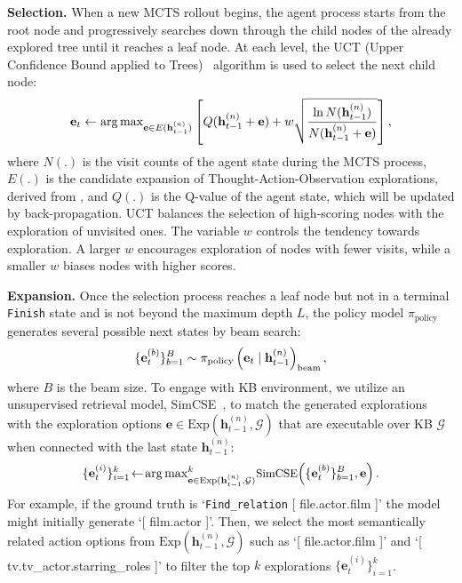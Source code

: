\documentclass{article}
\theoremstyle{plain}
\theoremstyle{definition}
\theoremstyle{remark}
\begin{document}
\textbf{Selection. } When a new MCTS rollout begins, the agent process starts from the root node and progressively searches down through the child nodes of the already explored tree until it reaches a leaf node. At each level, the UCT (Upper Confidence Bound applied to Trees)~\citep{MCTS} algorithm is used to select the next child node:
\begin{equation}
\small
    \mathbf{e}_t \gets {\arg\max}_{\mathbf{e} \in E(\mathbf{h}^{(n)}_{t-1})} \left[ Q(\mathbf{h}^{(n)}_{t-1}+\mathbf{e}) + w \sqrt{\frac{\ln N(\mathbf{h}^{(n)}_{t-1})}{N(\mathbf{h}^{(n)}_{t-1}+\mathbf{e})}} \right],
\end{equation}
where $N(.)$ is the visit counts of the agent state during the MCTS process, $E(.)$ is the candidate expansion of Thought-Action-Observation explorations, derived from , and $Q(.)$ is the Q-value of the agent state, which will be updated by back-propagation. UCT balances the selection of high-scoring nodes with the exploration of unvisited ones. The variable $w$ controls the tendency towards exploration. A larger $w$ encourages exploration of nodes with fewer visits, while a smaller $w$ biases nodes with higher scores.

\textbf{Expansion. }
Once the selection process reaches a leaf node but not in a terminal \texttt{Finish} state and is not beyond the maximum depth $L$, the policy model $\pi_{\text{policy}}$ generates several possible next states by beam search:
\begin{equation}
\small
    \{\mathbf{e}_t^{(b)}\}_{b=1}^B\sim\pi_{\text{policy}}\left(\mathbf{e}_t \mid \mathbf{h}_{t-1}^{(n)}\right)_{\text{beam}},
\end{equation}
where $B$ is the beam size. To engage with KB environment, we utilize an unsupervised retrieval model, SimCSE~\citep{SimCSE}, to match the generated explorations with the exploration options $\mathbf{e} \in \text{Exp}(\mathbf{h}_{t-1}^{(n)},\mathcal{G})$ that are executable over KB $\mathcal{G}$ when connected with the last state $\mathbf{h}_{t-1}^{(n)}$:
\begin{equation}
\small
    \{\mathbf{e}_t^{(i)}\}_{i=1}^k\! \gets\! {\arg\max}^k_{\mathbf{e} \in \text{Exp}(\mathbf{h}_{t-1}^{(n)},\mathcal{G})}\text{SimCSE}\!\left(\{\mathbf{e}_t^{(b)}\}_{b=1}^B, \mathbf{e}\right).
\end{equation}
For example, if the ground truth is `\texttt{Find\_relation} [ file.actor.film ]' the model might initially generate `[ film.actor ]'. Then, we select the most semantically related action options from $\text{Exp}(\mathbf{h}_{t-1}^{(n)},\mathcal{G})$ such as `[ file.actor.film ]' and `[ tv.tv\_actor.starring\_roles ]' to filter the top $k$ explorations $\{\mathbf{e}_t^{(i)}\}_{i=1}^k$.
\end{document}
